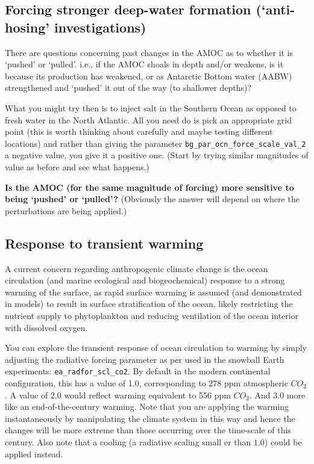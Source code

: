 
\subsection{Forcing stronger deep-water formation (‘anti-hosing’ investigations)}

There are questions concerning past changes in the AMOC as to whether it is ‘pushed’ or ‘pulled’. i.e., if the AMOC shoals in depth and/or weakens, is it because its production has weakened, or as Antarctic Bottom water (AABW) strengthened and ‘pushed’ it out of the way (to shallower depths)?

What you might try then is to inject salt in the Southern Ocean as opposed to fresh water in the North Atlantic. All you need do is pick an appropriate grid point (this is worth thinking about carefully and maybe testing different locations) and rather than giving the parameter \texttt{bg\_par\_ocn\_force\_scale\_val\_2} a negative value, you give it a positive one. (Start by trying similar magnitudes of value as before and see what happens.)

\textbf{Is the AMOC (for the same magnitude of forcing) more sensitive to being ‘pushed’ or ‘pulled’?} (Obviously the answer will  depend on where the perturbations are being applied.)


\subsection{Response to transient warming}

A current concern regarding anthropogenic climate change is the ocean circulation (and marine ecological and biogeochemical) response to a strong warming of the surface, as rapid surface warming is assumed (and demonstrated in models) to result in surface stratification of the ocean, likely restricting the nutrient supply to phytoplankton and reducing ventilation of the ocean interior with dissolved oxygen.

You can explore the transient response of ocean circulation to warming by simply adjusting the radiative forcing parameter as per used in the snowball Earth experiments: \texttt{ea\_radfor\_scl\_co2}. By default in the modern continental configuration, this has a value of 1.0, corresponding to 278 ppm atmospheric \(CO_{2}\). A value of 2.0 would reflect warming equivalent to 556 ppm \(CO_{2}\). And 3.0 more like an end-of-the-century warming. Note that you are applying the warming instantaneously by manipulating the climate system in this way and hence the changes will be more extreme than those occurring over the time-scale of this century. Also note that a cooling (a radiative scaling small er than $1.0$) could be applied instead.

